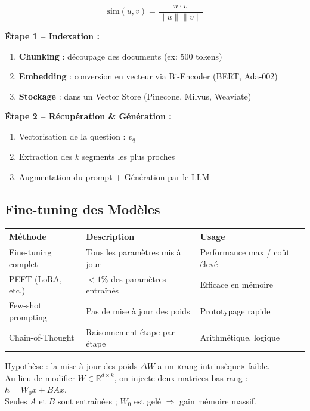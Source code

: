 \documentclass[a4paper,10pt]{article}
\begin{document}
\begin{formulebox}
\[
\text{sim}(u, v) = \frac{u \cdot v}{\|u\| \|v\|}
\]
\end{formulebox}

\textbf{Étape 1 -- Indexation :}
\begin{enumerate}
  \item \textbf{Chunking} : découpage des documents (ex: 500 tokens)
  \item \textbf{Embedding} : conversion en vecteur via Bi-Encoder (BERT, Ada-002)
  \item \textbf{Stockage} : dans un Vector Store (Pinecone, Milvus, Weaviate)
\end{enumerate}

\textbf{Étape 2 -- Récupération \& Génération :}
\begin{enumerate}
  \item Vectorisation de la question : $v_q$
  \item Extraction des $k$ segments les plus proches
  \item Augmentation du prompt + Génération par le LLM
\end{enumerate}

\subsection{Fine-tuning des Modèles}

\begin{center}
\small
\begin{tabular}{lll}
\toprule
\textbf{Méthode} & \textbf{Description} & \textbf{Usage} \\
\midrule
Fine-tuning complet & Tous les paramètres mis à jour & Performance max / coût élevé \\
PEFT (LoRA, etc.) & $< 1\%$ des paramètres entraînés & Efficace en mémoire \\
Few-shot prompting & Pas de mise à jour des poids & Prototypage rapide \\
Chain-of-Thought & Raisonnement étape par étape & Arithmétique, logique \\
\bottomrule
\end{tabular}
\end{center}

\begin{definitionbox}
Hypothèse : la mise à jour des poids $\Delta W$ a un «rang intrinsèque» faible.\\
Au lieu de modifier $W \in \mathbb{R}^{d \times k}$, on injecte deux matrices bas rang : $h = W_0 x + BAx$.\\
Seules $A$ et $B$ sont entraînées ; $W_0$ est gelé $\Rightarrow$ gain mémoire massif.
\end{definitionbox}
\end{document}
